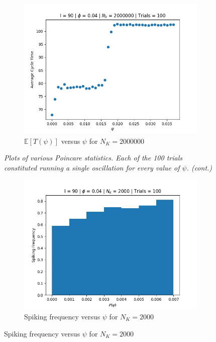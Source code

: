 \documentclass[letterpaper,12pt]{article}
\numberwithin{table}{section}
\numberwithin{figure}{section}
\numberwithin{equation}{section}
\newcommand*{\ev}[1]{\mathbb{E}\left[#1\right]}
\newcommand{\ccaption}[1]{\caption{\textit{#1}}}
\begin{document}
\begin{flushleft}
\begin{figure}[!h]
        \begin{subfigure}{0.72\textwidth}
            \includegraphics[width=\linewidth]{img/pt-nk2000000.jpg}
            \caption{$\ev{T(\psi)}$ versus $\psi$ for $N_K = 2000000$}
        \end{subfigure}

        \captionsetup{width=0.8\linewidth}
        \ccaption{Plots of various Poincare statistics. Each of the 100 trials constituted running a single oscillation for every value of $\psi$. (cont.)}

    \end{figure}
    \begin{figure}[!h]\ContinuedFloat

        \centering

        \begin{subfigure}{0.72\textwidth}
            \includegraphics[width=\linewidth]{img/pspike-nk2000.jpg}
            \caption{Spiking frequency versus $\psi$ for $N_K = 2000$}
        \end{subfigure}
    

\end{figure}
\end{flushleft}
\end{document}
